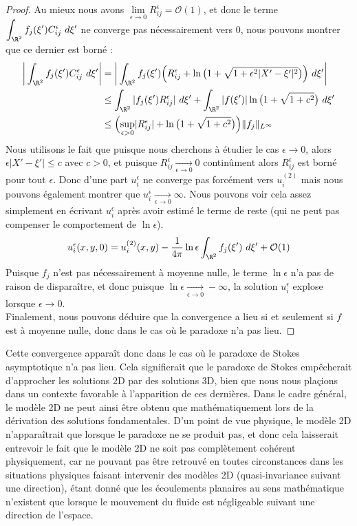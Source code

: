 \begin{proof}
Au mieux nous avons $ \underset{\epsilon \to 0}{\lim} R_{ij}^{\epsilon} = \mathcal{O}(1)$, et donc le terme $\displaystyle \int_{\R^2} f_j(\xi')C_{ij}^{\epsilon} \ d\xi'$ ne converge pas nécessairement vers 0, nous pouvons montrer que ce dernier est borné :
\begin{align*}
    \bigg| \int_{\R^2} f_j(\xi')C_{ij}^{\epsilon} \ d\xi' \bigg| &= \bigg| \int_{\R^2} f_j(\xi')\Big(R_{ij}^{\epsilon} + \ln\big(1 + \sqrt{1 + \epsilon^2 |X' - \xi'|^2}\big) \Big) \ d\xi' \bigg| \\
    &\leq \int_{\R^2} |f_j(\xi')R_{ij}^{\epsilon}| \ d\xi' + \int_{\R^2} |f(\xi')|\ln\big(1 + \sqrt{1 + c^2} \big) \ d\xi' \\
    &\leq \Big( \underset{\epsilon > 0}{\sup}|R_{ij}^{\epsilon}| + \ln\big( 1 + \sqrt{1 + c^2} \big)\Big) \|f_j\|_{L^{\infty}}
\end{align*}
Nous utilisons le fait que puisque nous cherchons à étudier le cas $\epsilon \to 0$, alors $\epsilon |X' - \xi'| \leq c$ avec $c > 0$, et puisque $R_{ij}^{\epsilon} \xrightarrow[\epsilon \to 0]{} 0$ continûment alors $R_{ij}^{\epsilon}$ est borné pour tout $\epsilon$.
Donc d'une part $u_i^{\epsilon}$ ne converge pas 
forcément vers $u_i^{(2)}$ mais nous pouvons également montrer que $u_i^{\epsilon} \xrightarrow[\epsilon \to 0]{} \infty$. Nous pouvons voir cela assez simplement en écrivant $u_i^{\epsilon}$ après avoir estimé le terme de reste (qui ne peut pas compenser le comportement de $\ln \epsilon$).
$$u_i^{\epsilon}(x,y,0) = u_i^{(2)}(x,y) - \frac{1}{4\pi}\ln \epsilon \int_{\R^2} f_j(\xi') \ d\xi' + \mathcal{O}(1) $$
Puisque $f_j$ n'est pas nécessairement à moyenne nulle, le terme $\ln \epsilon$ n'a pas de raison de disparaître, et donc puisque $\ln \epsilon \xrightarrow[\epsilon \to 0]{} - \infty$, la solution $u_i^{\epsilon}$ explose lorsque $\epsilon \to 0$.\\
Finalement, nous pouvons déduire que la convergence a lieu si et seulement si $f$ est à moyenne nulle, donc dans le cas où le paradoxe n'a pas lieu.
\end{proof}
Cette convergence apparaît donc dans le cas où le paradoxe de Stokes asymptotique n'a pas lieu. 
Cela signifierait que le paradoxe de Stokes empêcherait d'approcher les solutions 2D par des solutions 3D, bien que nous nous plaçions dans un contexte favorable à l'apparition de ces dernières. 
Dans le cadre général, le modèle 2D ne peut ainsi être obtenu que mathématiquement lors de la dérivation des solutions fondamentales. D'un point de vue physique, le modèle 2D n'apparaîtrait que lorsque le paradoxe ne se produit pas, et donc 
cela laisserait entrevoir le fait que le modèle 2D ne soit pas complètement cohérent physiquement, car ne pouvant pas être retrouvé en toutes circonstances dans les situations physiques faisant intervenir des modèles 2D (quasi-invariance suivant une direction), étant donné que les écoulements planaires au sens mathématique n'existent que lorsque 
le mouvement du fluide est négligeable suivant une direction de l'espace.





